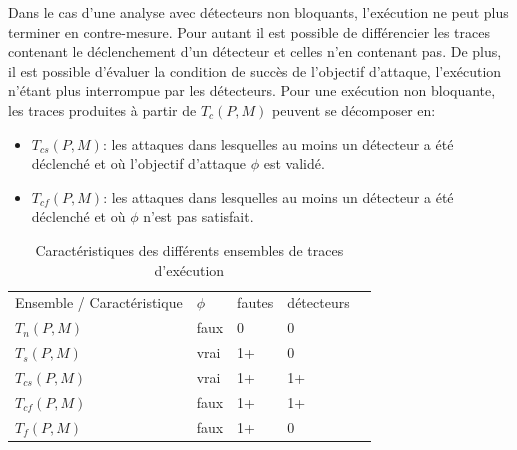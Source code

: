             Dans le cas d'une analyse avec détecteurs non bloquants, l'exécution ne peut plus terminer en contre-mesure. 
            Pour autant il est possible de différencier les traces contenant le déclenchement d'un détecteur et celles n'en contenant pas.
            De plus, il est possible d'évaluer la condition de succès de l'objectif d'attaque, l'exécution n'étant plus interrompue par les détecteurs.
            Pour une exécution non bloquante, les traces produites à partir de $T_c(P, M)$ peuvent se décomposer en:
            \begin{itemize}
                \item $T_{cs}(P, M)$: les attaques dans lesquelles au moins un détecteur a été déclenché et où l'objectif d'attaque $\phi$ est validé.
                \item $T_{cf}(P, M)$: les attaques dans lesquelles au moins un détecteur a été déclenché et où $\phi$ n'est pas satisfait.
            \end{itemize}
       
            \begin{table}[h]
            \centering
                \begin{tabular}{|l|l|l|l|l}
                \cline{1-4}
                Ensemble / Caractéristique & $\phi$ & fautes & détecteurs                                                                                                                                                                               &  \\ \cline{1-4}
                $T_n(P, M)$                   & faux\footnotemark    & 0      & 0\footnotemark &  \\ \cline{1-4}
                $T_s(P, M)$                   & vrai   & 1+     & 0                                                                                                                                                                                        &  \\ \cline{1-4}
                $T_{cs}(P, M)$                & vrai   & 1+     & 1+                                                                                                                                                                                       &  \\ \cline{1-4}
                $T_{cf}(P, M)$                & faux   & 1+     & 1+                                                                                                                                                                                       &  \\ \cline{1-4}
                $T_f(P, M)$                   & faux   & 1+     & 0                                                                                                                                                                                        &  \\ \cline{1-4}
                \end{tabular}
            \caption{Caractéristiques des différents ensembles de traces d'exécution\label{tbl:traces-categories}}
            \end{table}

